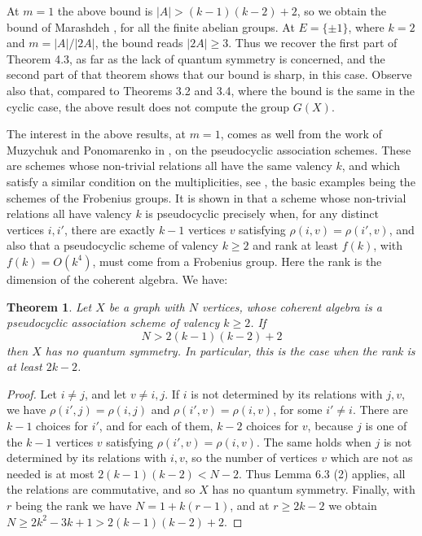 \documentclass[11pt]{amsart}
\newtheorem{theorem}{Theorem}[section]
\begin{document}
At $m=1$ the above bound is $|A|>(k-1)(k-2)+2$, so we obtain the bound of Marashdeh \cite{mar}, for all the finite abelian groups. At $E=\{\pm1\}$, where $k=2$ and $m=|A|/|2A|$, the bound reads $|2A|\geq3$. Thus we recover the first part of Theorem 4.3, as far as the lack of quantum symmetry is concerned, and the second part of that theorem shows that our bound is sharp, in this case. Observe also that, compared to Theorems 3.2 and 3.4, where the bound is the same in the cyclic case, the above result does not compute the group $G(X)$.

The interest in the above results, at $m=1$, comes as well from the work of Muzychuk and Ponomarenko in \cite{mp1}, on the pseudocyclic association schemes. These are schemes whose non-trivial relations all have the same valency $k$, and which satisfy a similar condition on the multiplicities, see \cite{mp1}, the basic examples being the schemes of the Frobenius groups. It is shown in \cite{mp1} that a scheme whose non-trivial relations all have valency $k$ is pseudocyclic precisely when, for any distinct vertices $i,i'$, there are exactly $k-1$ vertices $v$ satisfying $\rho(i,v)=\rho(i',v)$, and also that a pseudocyclic scheme of valency $k\geq2$ and rank at least $f(k)$, with $f(k)=O(k^4)$, must come from a Frobenius group. Here the rank is the dimension of the coherent algebra. We have:

\begin{theorem}
Let $X$ be a graph with $N$ vertices, whose coherent algebra is a pseudocyclic association scheme of valency $k\geq2$. If
$$N>2(k-1)(k-2)+2$$
then $X$ has no quantum symmetry. In particular, this is the case when the rank is at least $2k-2$.
\end{theorem}

\begin{proof}
Let $i\neq j$, and let $v\neq i,j$. If $i$ is not determined by its relations with $j,v$, we have $\rho(i',j)=\rho(i,j)$ and $\rho(i',v)=\rho(i,v)$, for some $i'\neq i$. There are $k-1$ choices for $i'$, and for each of them, $k-2$ choices for $v$, because $j$ is one of the $k-1$ vertices $v$ satisfying $\rho(i',v)=\rho(i,v)$. The same holds when $j$ is not determined by its relations with $i,v$, so the number of vertices $v$ which are not as needed is at most $2(k-1)(k-2)<N-2$. Thus Lemma 6.3 (2) applies, all the relations are commutative, and so $X$ has no quantum symmetry. Finally, with $r$ being the rank we have $N=1+k(r-1)$, and at $r\geq2k-2$ we obtain $N\geq2k^2-3k+1>2(k-1)(k-2)+2$.
\end{proof}
\end{document}
